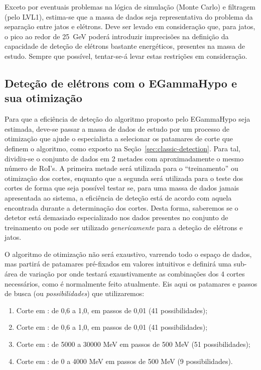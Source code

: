 Exceto por eventuais problemas na lógica de simulação (Monte Carlo) e
filtragem (pelo LVL1), estima-se que a massa de dados seja representativa do
problema da separação entre jatos e elétrons. Deve ser levado em consideração
que, para jatos, o pico ao redor de 25~GeV poderá introduzir imprecisões na
definição da capacidade de deteção de elétrons bastante energéticos, presentes
na massa de estudo. Sempre que possível, tentar-se-á levar estas restrições em
consideração.

\subsection{Deteção de elétrons com o EGammaHypo e sua otimização}
\label{sec:eghypo}

Para que a eficiência de deteção do algoritmo proposto pelo EGammaHypo seja
estimada, deve-se passar a massa de dados de estudo por um processo de
otimização que ajude o especialista a selecionar os patamares de corte que
definem o algoritmo, como exposto na Seção~\ref{sec:classic-detection}. Para
tal, dividiu-se o conjunto de dados em 2 metades com aproximadamente o mesmo
número de RoI's. A primeira metade será utilizada para o ``treinamento'' ou
otimização dos cortes, enquanto que a segunda será utilizada para o teste dos
cortes de forma que seja possível testar se, para uma massa de dados jamais
apresentada ao sistema, a eficiência de deteção está de acordo com aquela
encontrada durante a determinação dos cortes. Desta forma, saberemos se o
detetor está demasiado especializado nos dados presentes no conjunto de
treinamento ou pode ser utilizado \emph{genericamente} para a deteção de
elétrons e jatos.

O algoritmo de otimização não será exaustivo, varrendo todo o espaço de dados,
mas partirá de patamares pré-fixados em valores intuitivos e definirá uma
sub-área de variação por onde testará exaustivamente as combinações dos 4
cortes necessários, como é normalmente feito atualmente. Eis aqui os patamares
e passos de busca (ou \emph{possibilidades}) que utilizaremos:

\begin{enumerate}
\item Corte em \rcore: de 0,6 a 1,0, em passos de 0,01 (41 possibilidades);
\item Corte em \eratio: de 0,6 a 1,0, em passos de 0,01 (41 possibilidades);
\item Corte em \etem: de 5000 a 30000 MeV em passos de 500 MeV (51
possibilidades);
\item Corte em \ethad: de 0 a 4000 MeV em passos de 500 MeV (9
possibilidades). 
\end{enumerate}

